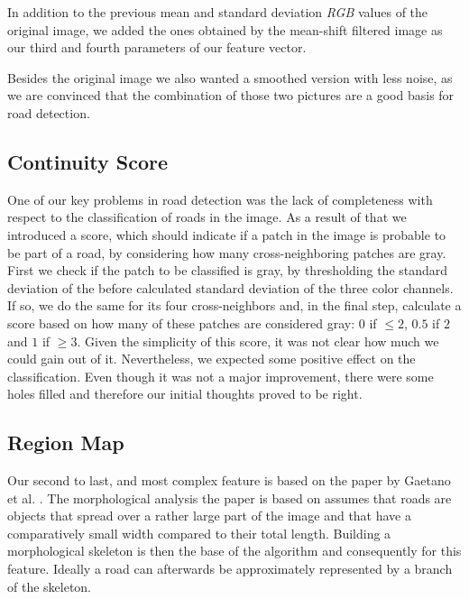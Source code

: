 \documentclass[10pt,conference,compsocconf]{IEEEtran}
\begin{document}
In addition to the previous mean and standard deviation \emph{RGB} values of the original image, we added the ones obtained by the mean-shift filtered image as our third and fourth parameters of our feature vector. 

Besides the original image we also wanted a smoothed version with less noise, as we are convinced that the combination of those two pictures are a good basis for road detection.

\subsection{Continuity Score}
\label{sec:continuity_score}
One of our key problems in road detection was the lack of completeness with respect to the classification of roads in the image. As a result of that we introduced a score, which should indicate if a patch in the image is probable to be part of a road, by considering how many cross-neighboring patches are gray. First we check if the patch to be classified is gray, by thresholding the standard deviation of the before calculated standard deviation of the three color channels. If so, we do the same for its four cross-neighbors and, in the final step, calculate a score based on how many of these patches are considered gray: $0$ if $\leq2$, $0.5$ if $2$ and $1$ if $\geq3$.
Given the simplicity of this score, it was not clear how much we could gain out of it. Nevertheless, we expected some positive effect on the classification. Even though it was not a major improvement, there were some holes filled and therefore our initial thoughts proved to be right.

\subsection{Region Map}
Our second to last, and most complex feature is based on the paper by Gaetano et al. \cite{GaZeScPo11}. The morphological analysis the paper is based on assumes that roads are objects that spread over a rather large part of the image and that have a comparatively small width compared to their total length. Building a morphological skeleton is then the base of the algorithm and consequently for this feature. Ideally a road can afterwards be approximately represented by a branch of the skeleton.
\end{document}
